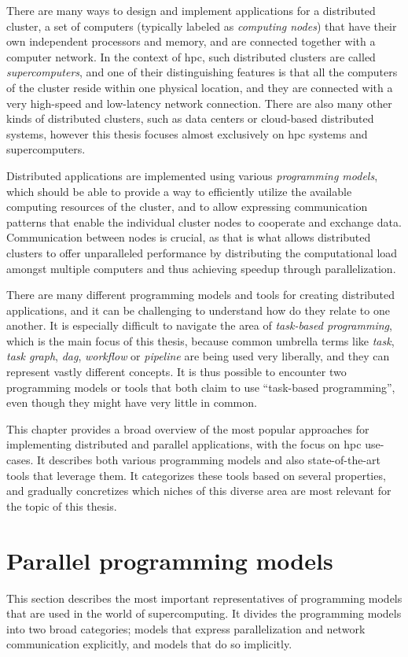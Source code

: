 There are many ways to design and implement applications for a distributed cluster, a set of
computers (typically labeled as \emph{computing nodes}) that have their own independent
processors and memory, and are connected together with a computer network. In the context of
\gls{hpc}, such distributed clusters are called \emph{supercomputers}, and
one of their distinguishing features is that all the computers of the cluster reside within one
physical location, and they are connected with a very high-speed and low-latency network
connection. There are also many other kinds of distributed clusters, such as data centers or
cloud-based distributed systems, however this thesis focuses almost exclusively on
\gls{hpc} systems and supercomputers.

Distributed applications are implemented using various \emph{programming models}, which should be
able to provide a way to efficiently utilize the available computing resources of the cluster, and
to allow expressing communication patterns that enable the individual cluster nodes to cooperate
and exchange data. Communication between nodes is crucial, as that is what allows distributed
clusters to offer unparalleled performance by distributing the computational load amongst multiple
computers and thus achieving speedup through parallelization.

There are many different programming models and tools for creating distributed applications, and it
can be challenging to understand how do they relate to one another. It is especially difficult to
navigate the area of \emph{task-based programming}, which is the main focus of this thesis, because
common umbrella terms like \emph{task}, \emph{task graph},
\emph{\gls{dag}}, \emph{workflow} or \emph{pipeline} are being
used very liberally, and they can represent vastly different concepts. It is thus possible to
encounter two programming models or tools that both claim to use ``task-based programming'', even
though they might have very little in common.

This chapter provides a broad overview of the most popular approaches for implementing distributed
and parallel applications, with the focus on \gls{hpc} use-cases. It describes
both various programming models and also state-of-the-art tools that leverage them. It categorizes
these tools based on several properties, and gradually concretizes which niches of this diverse
area are most relevant for the topic of this thesis.

\section{Parallel programming models}
This section describes the most important representatives of programming models that are used in
the world of supercomputing. It divides the programming models into two broad categories; models
that express parallelization and network communication explicitly, and models that do so
implicitly.

